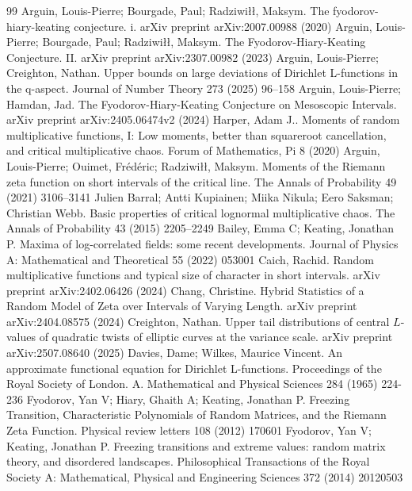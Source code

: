 \documentclass[10pt,a4paper]{amsart}
\numberwithin{equation}{section}
\begin{document}
\begin{thebibliography}{99}
 Arguin, Louis-Pierre; Bourgade, Paul; Radziwi{\l}{\l}, Maksym. The fyodorov-hiary-keating conjecture. i. arXiv preprint arXiv:2007.00988 (2020)
 Arguin, Louis-Pierre; Bourgade, Paul; Radziwi{\l}{\l}, Maksym. The Fyodorov-Hiary-Keating Conjecture. II. arXiv preprint arXiv:2307.00982 (2023)
 Arguin, Louis-Pierre; Creighton, Nathan. Upper bounds on large deviations of Dirichlet L-functions in the q-aspect. Journal of Number Theory 273 (2025) 96--158
 Arguin, Louis-Pierre; Hamdan, Jad. The Fyodorov-Hiary-Keating Conjecture on Mesoscopic Intervals. arXiv preprint arXiv:2405.06474v2 (2024)
 Harper, Adam J.. Moments of random multiplicative functions, I: Low moments, better than squareroot cancellation, and critical multiplicative chaos. Forum of Mathematics, Pi 8 (2020)
 Arguin, Louis-Pierre; Ouimet, Fr{\'e}d{\'e}ric; Radziwi{\l}{\l}, Maksym. Moments of the Riemann zeta function on short intervals of the critical line. The Annals of Probability 49 (2021) 3106--3141
 Julien Barral; Antti Kupiainen; Miika Nikula; Eero Saksman; Christian Webb. Basic properties of critical lognormal multiplicative chaos. The Annals of Probability 43 (2015) 2205--2249
 Bailey, Emma C; Keating, Jonathan P. Maxima of log-correlated fields: some recent developments. Journal of Physics A: Mathematical and Theoretical 55 (2022) 053001
 Caich, Rachid. Random multiplicative functions and typical size of character in short intervals. arXiv preprint arXiv:2402.06426 (2024)
 Chang, Christine. Hybrid Statistics of a Random Model of Zeta over Intervals of Varying Length. arXiv preprint arXiv:2404.08575 (2024)
 Creighton, Nathan. Upper tail distributions of central $ L $-values of quadratic twists of elliptic curves at the variance scale. arXiv preprint arXiv:2507.08640 (2025)
 Davies, Dame; Wilkes, Maurice Vincent. An approximate functional equation for Dirichlet L-functions. Proceedings of the Royal Society of London. A. Mathematical and Physical Sciences 284 (1965) 224-236
 Fyodorov, Yan V; Hiary, Ghaith A; Keating, Jonathan P. Freezing Transition, Characteristic Polynomials of Random Matrices, and the Riemann Zeta Function. Physical review letters 108 (2012) 170601
 Fyodorov, Yan V; Keating, Jonathan P. Freezing transitions and extreme values: random matrix theory, and disordered landscapes. Philosophical Transactions of the Royal Society A: Mathematical, Physical and Engineering Sciences 372 (2014) 20120503

\end{thebibliography}
\end{document}
